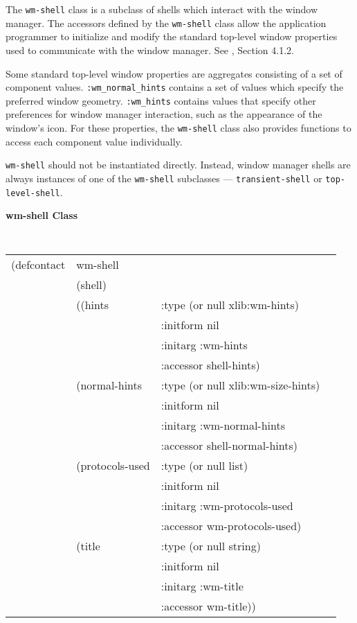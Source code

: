 
The {\tt wm-shell} class is a subclass of shells which interact with the
window manager.  The accessors defined by the {\tt wm-shell} class allow
the application programmer to initialize and modify the standard
top-level window properties used to communicate with the window
manager. See \cite{icccm}, Section 4.1.2.

Some standard top-level window properties are aggregates consisting of a set of
component values.  {\tt :wm\-\_normal\-\_hints} contains a set of values which
specify the preferred window geometry.  {\tt :wm\_hints} contains values that
specify other preferences for window manager interaction, such as the appearance
of the window's icon.  For these properties, the {\tt wm-shell} class also
provides functions to access each component value individually. 


{\tt wm-shell} should not be instantiated directly.  Instead, window
manager shells are always instances of one of the {\tt wm-shell}
subclasses --- {\tt transient-shell} or {\tt top-level-shell}.

{\samepage 
{\large {\bf wm-shell \hfill Class}} 
\begin{flushright} \parbox[t]{6.125in}{
\tt
\begin{tabular}{llll}
\raggedright
(defcontact &wm-shell \\
& (shell) \\
& ((hints&                :type     (or null xlib:wm-hints) \\
&			& :initform nil  \\
&			& :initarg  :wm-hints \\
&			& :accessor shell-hints)    \\
&   (normal-hints &        :type     (or null xlib:wm-size-hints) \\
&			& :initform nil  \\
&			& :initarg  :wm-normal-hints \\
&			& :accessor shell-normal-hints) \\
&   (protocols-used &           :type     (or null list)  \\
&			& :initform nil  \\
&			& :initarg  :wm-protocols-used \\
&			& :accessor wm-protocols-used) \\
&   (title   &             :type     (or null string) \\
&			& :initform nil  \\
&			& :initarg  :wm-title \\
&			& :accessor wm-title))\\
\end{tabular}
\rm
}\end{flushright}}

